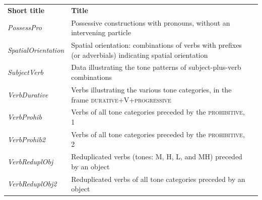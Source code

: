 \begin{table}[H]
  {\renewcommand{\arraystretch}{1.35}
    \begin{tabularx}{\textwidth}{ @{}l Q >{\raggedleft\arraybackslash}P{20mm}}
  \textbf{Short title} & \textbf{Title} &  \\  
      \textit{PossessPro} & Possessive constructions with pronouns, without an intervening particle &  \\
      \textit{SpatialOrientation} & Spatial orientation: combinations of verbs with prefixes (or adverbials) indicating spatial orientation &  \\ %
      \textit{SubjectVerb} & Data illustrating the tone patterns of subject-plus-verb combinations &  \\

		\textit{VerbDurative} & Verbs illustrating the various tone categories, in the frame \textsc{durative}+V+\textsc{progressive} &  \\
		\textit{VerbProhib} & Verbs of all tone categories preceded by the \textsc{prohibitive}, 1 &  \\
		\textit{VerbProhib2} & Verbs of all tone categories preceded by the \textsc{prohibitive}, 2 &  \\
		\textit{VerbReduplObj} & Reduplicated verbs (tones: M, H, L, and MH) preceded by an object &  \\
		\textit{VerbReduplObj2} & Reduplicated verbs of all tone categories preceded by an object &  \\
      \end{tabularx}}
	\end{table}


